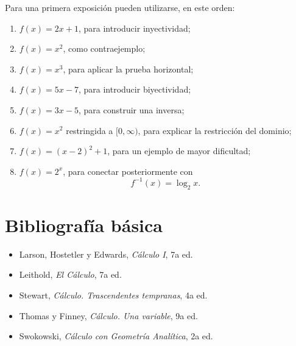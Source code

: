 \documentclass[12pt]{article}
\theoremstyle{remark}
\begin{document}
Para una primera exposición pueden utilizarse, en este orden:

\begin{enumerate}
    \item \(f(x)=2x+1\), para introducir inyectividad;
    \item \(f(x)=x^2\), como contraejemplo;
    \item \(f(x)=x^3\), para aplicar la prueba horizontal;
    \item \(f(x)=5x-7\), para introducir biyectividad;
    \item \(f(x)=3x-5\), para construir una inversa;
    \item \(f(x)=x^2\) restringida a \([0,\infty)\), para explicar
    la restricción del dominio;
    \item \(f(x)=(x-2)^2+1\), para un ejemplo de mayor dificultad;
    \item \(f(x)=2^x\), para conectar posteriormente con
    \[
    f^{-1}(x)=\log_2 x.
    \]
\end{enumerate}
\section*{Bibliografía básica}

\begin{itemize}
    \item Larson, Hostetler y Edwards, \emph{Cálculo I}, 7a ed.
    \item Leithold, \emph{El Cálculo}, 7a ed.
    \item Stewart, \emph{Cálculo. Trascendentes tempranas}, 4a ed.
    \item Thomas y Finney, \emph{Cálculo. Una variable}, 9a ed.
    \item Swokowski, \emph{Cálculo con Geometría Analítica}, 2a ed.
\end{itemize}
\end{document}
